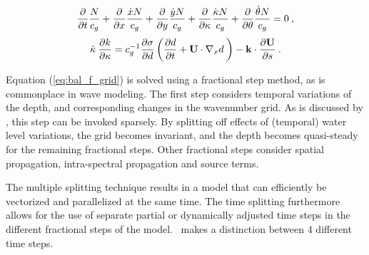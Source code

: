
\begin{equation}
\frac{\partial}{\partial t} \frac{N}{c_g} +  
\frac{\partial}{\partial x} \frac{\dot{x} N}{c_g} + 
\frac{\partial}{\partial y} \frac{\dot{y} N}{c_g} + 
\frac{\partial}{\partial \kappa} \frac{\dot{\kappa} N}{c_g} + 
\frac{\partial}{\partial \theta} \frac{\dot{\theta} N}{c_g}  =
0 \: , \label{eq:bal_f_grid} \end{equation} \begin{equation}
\dot{\kappa} \:\frac{\partial k}{\partial \kappa} =
     c_g^{-1} \frac{\partial \sigma}{\partial d} \left (
    \frac{\partial d}{\partial t} + {\bf U} \cdot \nabla_x d \: \right ) -
    {\bf k} \cdot \frac{\partial {\bf U}}{\partial s}
\: . \label{eq:sigma_dot}
\end{equation}

\noindent
Equation (\ref{eq:bal_f_grid}) is solved using a fractional step method, as is
commonplace in wave modeling. The first step considers temporal variations of
the depth, and corresponding changes in the wavenumber grid. As is discussed
by \cite{tol:GAOS98b}, this step can be invoked sparsely. By splitting off
effects of (temporal) water level variations, the grid becomes invariant, and
the depth becomes quasi-steady for the remaining fractional steps. Other
fractional steps consider spatial propagation, intra-spectral propagation and
source terms.

The multiple splitting technique results in a model that can efficiently be
vectorized and parallelized at the same time. The time splitting furthermore
allows for the use of separate partial or dynamically adjusted time steps in
the different fractional steps of the model. \ws\ makes a distinction between
4 different time steps. \label{dt_list}

